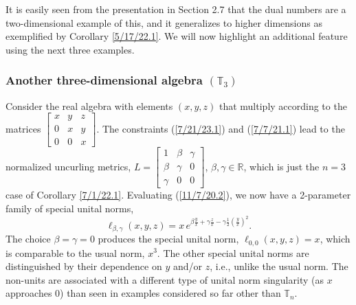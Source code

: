 \documentclass{amsart}
\numberwithin{equation}{section}
\theoremstyle{definition}
\numberwithin{theorem}{section}
\begin{document}
It is easily seen from the presentation in Section 2.7 that the dual numbers are a two-dimensional example of this, and it
generalizes to higher dimensions as exemplified by Corollary \ref{5/17/22.1}.  We will now highlight an additional feature using the next three examples.  

\subsubsection{Another three-dimensional algebra $(\mathbb{T}_3)$}Consider the real algebra with elements  $(x,y,z)$ that multiply according to the matrices $ \left[
\begin{array}{ccc}
x & y & z   \\
0 & x & y \\
0 & 0 & x  
\end{array}
\right]$.    The constraints (\ref{7/21/23.1}) and (\ref{7/7/21.1}) lead to the normalized uncurling metrics, $ L = \left[
\begin{array}{ccc}
1 & \beta & \gamma   \\
\beta & \gamma & 0 \\
\gamma & 0 & 0  
\end{array}
\right]$, $\beta,\gamma\in\mathbb{R}$, which is just the $n=3$ case of Corollary \ref{7/1/22.1}.    Evaluating (\ref{11/7/20.2}), we now have a 2-parameter family of special unital norms, \begin{equation}\label{3/31/21.3} \ell_{\beta,\gamma}(x,y,z) = x\, e^{ \beta\frac{y}{x}  +\gamma \frac{z}{x} -\gamma \frac{ 1}{2}\left(\frac{y}{x}\right)^2 }.\end{equation}    The choice $\beta = \gamma = 0$ produces the special unital norm, $\ell_{0,0}(x,y,z)= x$, which is comparable to the usual norm, $x^3$.  
 The other special unital norms are distinguished by their dependence on $y$ and/or $z$, i.e., unlike the usual norm.  The non-units are associated with a different type of unital norm singularity (as $x$ approaches 0) than seen in examples considered so far other than $\mathbb{T}_n$.
 
 
\end{document}
